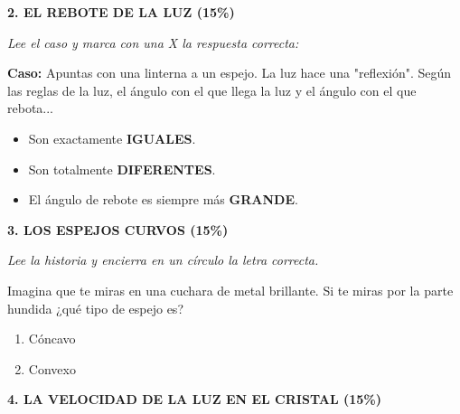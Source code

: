 \documentclass[12pt, letterpaper]{article}
\begin{document}
\vspace{0.6cm}

\noindent \textbf{\textcolor{valblue}{2. EL REBOTE DE LA LUZ (15\%)}}

\vspace{0.2cm}
\noindent \textit{Lee el caso y marca con una X la respuesta correcta:}

\vspace{0.2cm}
\noindent \textbf{Caso:} Apuntas con una linterna a un espejo. La luz hace una "reflexión". Según las reglas de la luz, el ángulo con el que llega la luz y el ángulo con el que rebota...

\vspace{0.2cm}
\begin{itemize}[itemsep=0.3cm]
    \item[$\square$] Son exactamente \textbf{IGUALES}.
    \item[$\square$] Son totalmente \textbf{DIFERENTES}.
    \item[$\square$] El ángulo de rebote es siempre más \textbf{GRANDE}.
\end{itemize}

\vspace{0.6cm}

\noindent \textbf{\textcolor{valblue}{3. LOS ESPEJOS CURVOS (15\%)}}

\vspace{0.2cm}
\noindent \textit{Lee la historia y encierra en un círculo la letra correcta.}

\vspace{0.2cm}
\noindent Imagina que te miras en una cuchara de metal brillante. Si te miras por la parte hundida ¿qué tipo de espejo es?

\vspace{0.2cm}
\begin{enumerate}[label=\Alph*), itemsep=0.2cm]
    \item Cóncavo 
    \item Convexo 
\end{enumerate}


\noindent \textbf{\textcolor{valblue}{4. LA VELOCIDAD DE LA LUZ EN EL CRISTAL (15\%)}}

\vspace{0.2cm}
\end{document}
